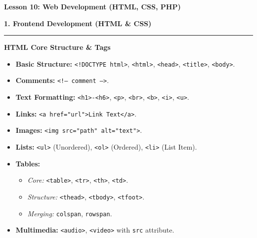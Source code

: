 \documentclass[a4paper, 8pt]{extarticle}
\newcommand{\sectionheading}[1]{\large\textbf{#1}\par\noindent\rule{\linewidth}{0.4pt}}
\newcommand{\subsectionheading}[1]{\normalsize\textbf{#1}}
\begin{document}
\pagestyle{empty} %

\begin{center}
    \fontsize{12pt}{14pt}\selectfont
    \textbf{Lesson 10: Web Development (HTML, CSS, PHP)}
\end{center}
\vspace{1em}

\begin{multicols}{2}


\sectionheading{1. Frontend Development (HTML \& CSS)}
\vspace{0.5em}
\subsectionheading{HTML Core Structure \& Tags}
\begin{itemize}
    \item \textbf{Basic Structure:} \texttt{<!DOCTYPE html>}, \texttt{<html>}, \texttt{<head>}, \texttt{<title>}, \texttt{<body>}.
    \item \textbf{Comments:} \texttt{<!-- comment -->}.
    \item \textbf{Text Formatting:} \texttt{<h1>-<h6>}, \texttt{<p>}, \texttt{<br>}, \texttt{<b>}, \texttt{<i>}, \texttt{<u>}.
    \item \textbf{Links:} \texttt{<a href="url">Link Text</a>}.
    \item \textbf{Images:} \texttt{<img src="path" alt="text">}.
    \item \textbf{Lists:} \texttt{<ul>} (Unordered), \texttt{<ol>} (Ordered), \texttt{<li>} (List Item).
    \item \textbf{Tables:} 
        \begin{itemize}
            \item \textit{Core:} \texttt{<table>}, \texttt{<tr>}, \texttt{<th>}, \texttt{<td>}.
            \item \textit{Structure:} \texttt{<thead>}, \texttt{<tbody>}, \texttt{<tfoot>}.
            \item \textit{Merging:} \texttt{colspan}, \texttt{rowspan}.
        \end{itemize}
    \item \textbf{Multimedia:} \texttt{<audio>}, \texttt{<video>} with \texttt{src} attribute.
\end{itemize}


\end{multicols}
\end{document}
